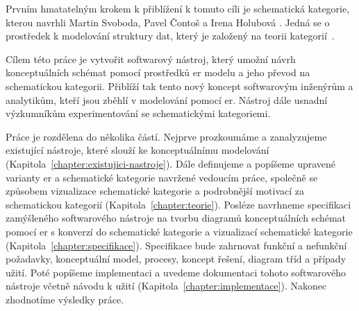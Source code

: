 Prvním hmatatelným krokem k přiblížení k tomuto cíli je schematická kategorie, kterou navrhli Martin Svoboda, Pavel Čontoš a Irena Holubová \cite{svoboda_categorical_2021}.
Jedná se o prostředek k modelování struktury dat, který je založený na teorii kategorií~\cite{eilenberg_generaltheory_1945}.

Cílem této práce je vytvořit softwarový nástroj, který umožní návrh konceptuálních schémat pomocí prostředků \acrshort{er} modelu a jeho převod na schematickou kategorii.
Přiblíží tak tento nový koncept softwarovým inženýrům a analytikům, kteří jsou zběhlí v modelování pomocí \acrshort{er}.
Nástroj dále usnadní výzkumníkům experimentování se schematickými kategoriemi.

Práce je rozdělena do několika částí.
Nejprve prozkoumáme a zanalyzujeme existující nástroje, které slouží ke konceptuálnímu modelování (Kapitola~\ref{chapter:existujici-nastroje}).
Dále definujeme a popíšeme upravené varianty \acrshort{er} a schematické kategorie navržené vedoucím práce, společně se způsobem vizualizace schematické kategorie a podrobnější motivací za schematickou kategorií (Kapitola~\ref{chapter:teorie}).
Posléze navrhneme specifikaci zamýšleného softwarového nástroje na tvorbu diagramů konceptuálních schémat pomocí \acrshort{er} s konverzí do schematické kategorie a vizualizací schematické kategorie (Kapitola~\ref{chapter:specifikace}).
Specifikace bude zahrnovat funkční a nefunkční požadavky, konceptuální model, procesy, koncept řešení, diagram tříd a případy užití.
Poté popíšeme implementaci a uvedeme dokumentaci tohoto softwarového nástroje včetně návodu k užití (Kapitola~\ref{chapter:implementace}).
Nakonec zhodnotíme výsledky práce.
